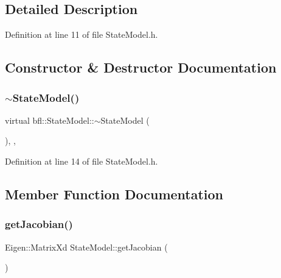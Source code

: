 \subsection{Detailed Description}


Definition at line 11 of file State\+Model.\+h.



\subsection{Constructor \& Destructor Documentation}
\mbox{\label{classbfl_1_1StateModel_ae07722f42306f297da2e55ce8cb0214a}} 
\subsubsection{\texorpdfstring{$\sim$\+State\+Model()}{~StateModel()}}
{\footnotesize\ttfamily virtual bfl\+::\+State\+Model\+::$\sim$\+State\+Model (\begin{DoxyParamCaption}{ }\end{DoxyParamCaption})\hspace{0.3cm}{\ttfamily [inline]}, {\ttfamily [virtual]}, {\ttfamily [noexcept]}}



Definition at line 14 of file State\+Model.\+h.



\subsection{Member Function Documentation}
\mbox{\label{classbfl_1_1StateModel_a78df4b39578345142fcfb18abaab2177}} 
\subsubsection{\texorpdfstring{get\+Jacobian()}{getJacobian()}}
{\footnotesize\ttfamily Eigen\+::\+Matrix\+Xd State\+Model\+::get\+Jacobian (\begin{DoxyParamCaption}{ }\end{DoxyParamCaption})\hspace{0.3cm}{\ttfamily [virtual]}}



